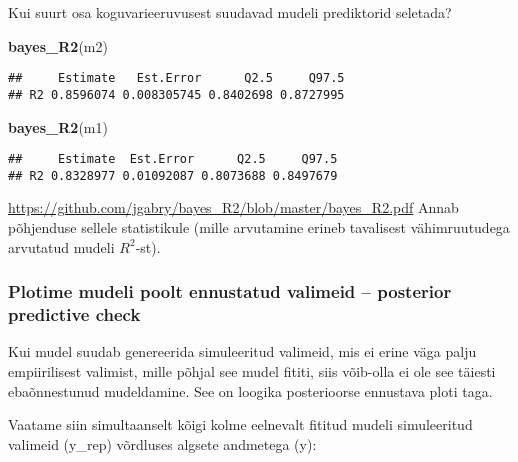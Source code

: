 \documentclass[]{article}
\newenvironment{Shaded}{\begin{snugshade}}{\end{snugshade}}
\newcommand{\KeywordTok}[1]{\textcolor[rgb]{0.13,0.29,0.53}{\textbf{#1}}}
\newcommand{\DataTypeTok}[1]{\textcolor[rgb]{0.13,0.29,0.53}{#1}}
\newcommand{\DecValTok}[1]{\textcolor[rgb]{0.00,0.00,0.81}{#1}}
\newcommand{\StringTok}[1]{\textcolor[rgb]{0.31,0.60,0.02}{#1}}
\newcommand{\OperatorTok}[1]{\textcolor[rgb]{0.81,0.36,0.00}{\textbf{#1}}}
\newcommand{\NormalTok}[1]{#1}
\begin{document}
Kui suurt osa koguvarieeruvusest suudavad mudeli prediktorid seletada?

\begin{Shaded}
\begin{Highlighting}[]
\KeywordTok{bayes_R2}\NormalTok{(m2)}
\end{Highlighting}
\end{Shaded}

\begin{verbatim}
##     Estimate   Est.Error      Q2.5     Q97.5
## R2 0.8596074 0.008305745 0.8402698 0.8727995
\end{verbatim}

\begin{Shaded}
\begin{Highlighting}[]
\KeywordTok{bayes_R2}\NormalTok{(m1)}
\end{Highlighting}
\end{Shaded}

\begin{verbatim}
##     Estimate  Est.Error      Q2.5     Q97.5
## R2 0.8328977 0.01092087 0.8073688 0.8497679
\end{verbatim}

\url{https://github.com/jgabry/bayes_R2/blob/master/bayes_R2.pdf} Annab
põhjenduse sellele statistikule (mille arvutamine erineb tavalisest
vähimruutudega arvutatud mudeli \(R^2\)-st).

\subsubsection{Plotime mudeli poolt ennustatud valimeid -- posterior
predictive
check}\label{plotime-mudeli-poolt-ennustatud-valimeid-posterior-predictive-check}

Kui mudel suudab genereerida simuleeritud valimeid, mis ei erine väga
palju empiirilisest valimist, mille põhjal see mudel fititi, siis
võib-olla ei ole see täiesti ebaõnnestunud mudeldamine. See on loogika
posterioorse ennustava ploti taga.

Vaatame siin simultaanselt kõigi kolme eelnevalt fititud mudeli
simuleeritud valimeid (y\_rep) võrdluses algsete andmetega (y):

\begin{Shaded}
\end{Shaded}
\end{document}
